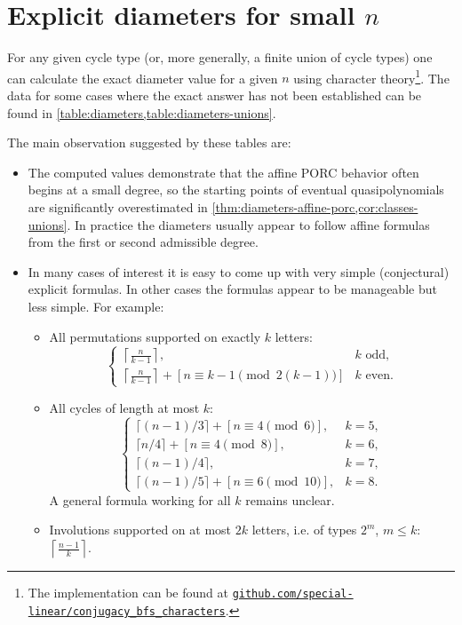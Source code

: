 \documentclass[DIV=12,10pt]{scrartcl}
\theoremstyle{definition}
\begin{document}
\section{Explicit diameters for small $n$}
\label{sec:explicit-diameters}
For any given cycle type (or, more generally, a finite union of cycle types) one can calculate the exact diameter value for a given $n$ using character theory\footnote{The implementation can be found at \href{https://github.com/special-linear/conjugacy_bfs_characters}{\texttt{github.com/special-linear/conjugacy\_bfs\_characters}}.}. The data for some cases where the exact answer has not been established can be found in \cref{table:diameters,table:diameters-unions}.

The main observation suggested by these tables are:
\begin{itemize}
\item The computed values demonstrate that the affine PORC behavior often begins at a small degree, so the starting points of eventual quasipolynomials are significantly overestimated in \cref{thm:diameters-affine-porc,cor:classes-unions}. In practice the diameters usually appear to follow affine formulas from the first or second admissible degree.
\item In many cases  of interest it is easy to come up with very simple (conjectural) explicit formulas. In other cases the formulas appear to be manageable but less simple. For example:
\begin{itemize}
	\item All permutations supported on exactly $k$ letters:
	\[
		\begin{cases}
			\left\lceil \frac{n}{k-1} \right\rceil, & \text{$k$ odd,} \\[5pt]
			\left\lceil \frac{n}{k-1} \right\rceil + [n \equiv k-1 \pmod{2(k-1)}] & \text{$k$ even.}
		\end{cases}
	\]
	\item All cycles of length at most $k$:
	\[
		\begin{cases}
			\lceil (n-1)/3 \rceil + [n\equiv 4 \pmod{6}], & k = 5, \\
			\lceil n/4 \rceil + [n\equiv 4 \pmod{8}], & k = 6, \\
			\lceil (n-1)/4 \rceil, & k = 7, \\
			\lceil (n-1)/5 \rceil + [n\equiv 6 \pmod{10}], & k = 8.
		\end{cases}
	\]
	A general formula working for all $k$ remains unclear.
	\item Involutions supported on at most $2k$ letters, i.e. of types $2^m$, $m\leqslant k$: $\left\lceil \frac{n-1}{k} \right\rceil$.

\end{itemize}
\end{itemize}
\end{document}
